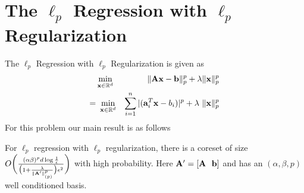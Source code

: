 \section{The $\ell_p$ Regression with $\ell_p$ Regularization}
The $\ell_p$ Regression with $\ell_p$ Regularization is given as 
\begin{eqnarray*}
&\min _{\mathbf{x} \in \mathbb{R}^d}& \|\mathbf{Ax} - \mathbf{b}\|_p^p + \lambda \|\M{x}\|_p^p\\
=&\	\min _{\mathbf{x} \in \mathbb{R}^d}& {\sum_{i=1}^n |(\mathbf{a}_i^T\mathbf{x} - b_i)|^p} + \lambda~\|\M{x}\|_p^p
\end{eqnarray*}
For this problem our main result is as follows
\begin{theorem}\label{th: lprlpr}
For $\ell_p$ regression with $\ell_p$ regularization, there is a coreset of size ${O}\bigg(\frac{(\alpha\beta)^pd\log{\frac{1}{\epsilon}}}{\big(1+\frac{\lambda}{\|\mathbf{A'}\|_{(p)}^p}\big)\epsilon^2}\bigg)$ with high probability. Here $\mathbf{A'} = [\mathbf{A} ~~ \mathbf{b}]$ and has an $(\alpha,\beta,p)$ well conditioned basis.
\end{theorem}
